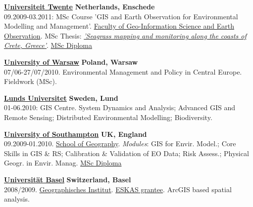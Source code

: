 \documentclass[10pt]{article}
\begin{document}
\href{http://www.utwente.nl/en}{\textbf{Universiteit Twente}} \hfill{\textbf{Netherlands, Enschede}}\\
09.2009-03.2011: MSc Course 'GIS and Earth Observation for Environmental Modelling and Management'.
\href{http://www.itc.nl/}{Faculty of Geo-Information Science and Earth Observation}. MSc Thesis: \href{https://zenodo.org/record/2290319}{\emph{'Seagrass mapping and monitoring along the coasts of Crete, Greece'}}. \href{https://drive.google.com/file/d/15nvWlDbIy9DfKZHMaGbFfrdFQcHNEWZS/view?usp=sharing}{MSc Diploma}
\vspace{0.7em}

\href{http://www.uw.edu.pl/en/}{\textbf{University of Warsaw}} \hfill{\textbf{Poland, Warsaw}}\\
07/06-27/07/2010. Environmental Management and Policy in Central Europe. Fieldwork (MSc).
\vspace{0.7em}	

\href{http://www.lunduniversity.lu.se/}{\textbf{Lunds Universitet}}
 \hfill{\textbf{Sweden, Lund}}\\
01-06.2010: GIS Centre. System Dynamics and Analysis; Advanced GIS and Remote Sensing; Distributed Environmental Modelling; Biodiversity.
\vspace{0.6em}

\href{http://www.southampton.ac.uk/}{\textbf{University of Southampton}} \hfill{\textbf{UK, England}}\\
 09.2009-01.2010. \href{http://www.southampton.ac.uk/geography/}{School of Geography}. \textit {Modules}: GIS for Envir. Model.; Core Skills in GIS \& RS; Calibration \& Validation of EO Data; Risk Assess.; Physical Geogr. in Envir. Manag. \href{https://drive.google.com/file/d/1I2DASP_waCDPbkQqRW479U-8ERztAKJP/view?usp=sharing}{MSc Diploma}\vspace{0.6em}

\href{http://www.unibas.ch/}{\textbf{Universit\"at Basel}} \hfill{\textbf{Switzerland, Basel}}\\
2008/2009. \href{http://www.physiogeo.unibas.ch/index.php?lang=en}{Geographisches Institut}. \href{https://drive.google.com/file/d/1IT99J8PqoiQZ5xbmlxdN5ty2eNkY6GIi/view?usp=sharing}{ESKAS grantee}. ArcGIS based spatial analysis.
\vspace{0.6em}
\end{document}
